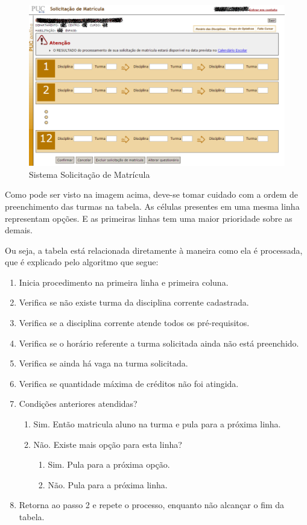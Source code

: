 \documentclass[graduacao,brazil]{ThesisPUC}
\begin{document}
\begin{figure}[H]
    \centering
    \includegraphics[width=\linewidth]{img/puc_online_antigo.png}
    \caption{Sistema Solicitação de Matrícula}
\end{figure}

Como pode ser visto na imagem acima, deve-se tomar cuidado com a ordem de preenchimento das turmas na tabela. As células presentes em uma mesma linha representam opções. E as primeiras linhas tem uma maior prioridade sobre as demais.

Ou seja, a tabela está relacionada diretamente à maneira como ela é processada, que é explicado pelo algoritmo que segue:

 \begin{enumerate}
 
 	\item Inicia procedimento na primeira linha e primeira coluna.
 	\item Verifica se não existe turma da disciplina corrente cadastrada.
 	\item Verifica se a disciplina corrente atende todos os pré-requisitos.
 	\item Verifica se o horário referente a turma solicitada ainda não está preenchido.
 	\item Verifica se ainda há vaga na turma solicitada.
 	\item Verifica se quantidade máxima de créditos não foi atingida.
 	\item Condições anteriores atendidas?
 	\begin{enumerate}
 		\item  Sim. Então matricula aluno na turma e pula para a próxima linha. 
 		\item  Não. Existe mais opção para esta linha?
 		\begin{enumerate}
 			\item Sim. Pula para a próxima opção.
 			\item Não. Pula para a próxima linha.
 		\end{enumerate}
 	\end{enumerate}
 	\item Retorna ao passo 2 e repete o processo, enquanto não alcançar o fim da tabela.
 \end{enumerate}
\end{document}
